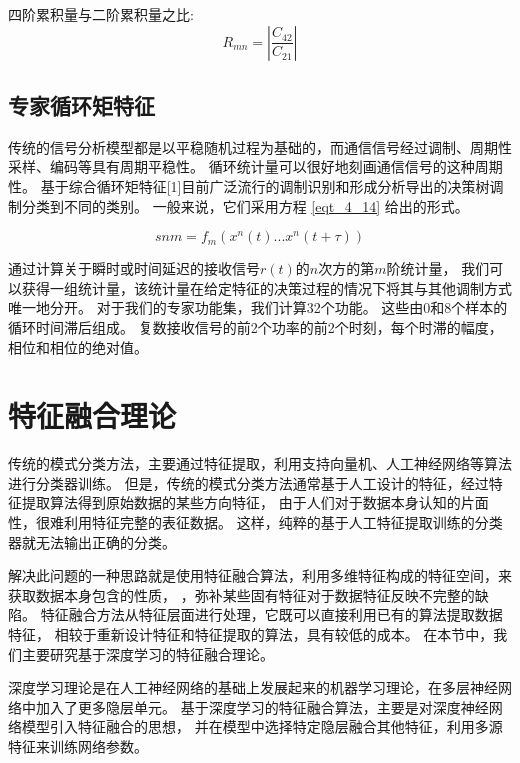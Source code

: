 四阶累积量与二阶累积量之比:
\begin{equation}
\label{eqt_4_13}
R_{mn} = |\frac{C_{42}}{C_{21}}|
\end{equation}
 

\subsection{专家循环矩特征}

传统的信号分析模型都是以平稳随机过程为基础的，而通信信号经过调制、周期性采样、编码等具有周期平稳性。
循环统计量可以很好地刻画通信信号的这种周期性。
基于综合循环矩特征[1]目前广泛流行的调制识别和形成分析导出的决策树调制分类到不同的类别。 
一般来说，它们采用方程 \ref{eqt_4_14} 给出的形式。

\begin{equation}
\label{eqt_4_14}
snm = f_{m}(x^{n}(t)...x^{n}(t + \tau))
\end{equation}

通过计算关于瞬时或时间延迟的接收信号$r(t)$的$n$次方的第$m$阶统计量，
我们可以获得一组统计量，该统计量在给定特征的决策过程的情况下将其与其他调制方式唯一地分开。 
对于我们的专家功能集，我们计算32个功能。 这些由0和8个样本的循环时间滞后组成。 
复数接收信号的前2个功率的前2个时刻，每个时滞的幅度，相位和相位的绝对值。\par


\section{特征融合理论}
传统的模式分类方法，主要通过特征提取，利用支持向量机、人工神经网络等算法进行分类器训练。 
但是，传统的模式分类方法通常基于人工设计的特征，经过特征提取算法得到原始数据的某些方向特征，
由于人们对于数据本身认知的片面性，很难利用特征完整的表征数据。
这样，纯粹的基于人工特征提取训练的分类器就无法输出正确的分类。\par

解决此问题的一种思路就是使用特征融合算法，利用多维特征构成的特征空间，来获取数据本身包含的性质，
，弥补某些固有特征对于数据特征反映不完整的缺陷。
特征融合方法从特征层面进行处理，它既可以直接利用已有的算法提取数据特征，
相较于重新设计特征和特征提取的算法，具有较低的成本。
在本节中，我们主要研究基于深度学习的特征融合理论。\par

深度学习理论是在人工神经网络的基础上发展起来的机器学习理论，在多层神经网络中加入了更多隐层单元。
基于深度学习的特征融合算法，主要是对深度神经网络模型引入特征融合的思想，
并在模型中选择特定隐层融合其他特征，利用多源特征来训练网络参数。\par

